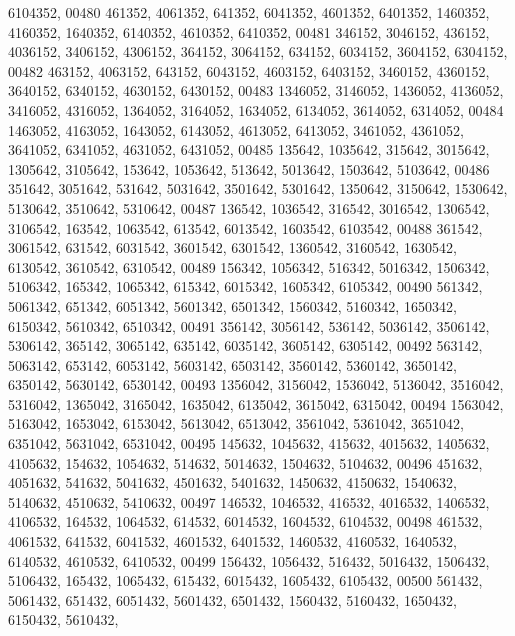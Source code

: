 \begin{DoxyCode}
      6104352,
00480        461352, 4061352,  641352, 6041352, 4601352, 6401352, 1460352, 4160352, 1640352, 6140352, 4610352, 
      6410352,
00481        346152, 3046152,  436152, 4036152, 3406152, 4306152,  364152, 3064152,  634152, 6034152, 3604152, 
      6304152,
00482        463152, 4063152,  643152, 6043152, 4603152, 6403152, 3460152, 4360152, 3640152, 6340152, 4630152, 
      6430152,
00483       1346052, 3146052, 1436052, 4136052, 3416052, 4316052, 1364052, 3164052, 1634052, 6134052, 3614052, 
      6314052,
00484       1463052, 4163052, 1643052, 6143052, 4613052, 6413052, 3461052, 4361052, 3641052, 6341052, 4631052, 
      6431052,
00485        135642, 1035642,  315642, 3015642, 1305642, 3105642,  153642, 1053642,  513642, 5013642, 1503642, 
      5103642,
00486        351642, 3051642,  531642, 5031642, 3501642, 5301642, 1350642, 3150642, 1530642, 5130642, 3510642, 
      5310642,
00487        136542, 1036542,  316542, 3016542, 1306542, 3106542,  163542, 1063542,  613542, 6013542, 1603542, 
      6103542,
00488        361542, 3061542,  631542, 6031542, 3601542, 6301542, 1360542, 3160542, 1630542, 6130542, 3610542, 
      6310542,
00489        156342, 1056342,  516342, 5016342, 1506342, 5106342,  165342, 1065342,  615342, 6015342, 1605342, 
      6105342,
00490        561342, 5061342,  651342, 6051342, 5601342, 6501342, 1560342, 5160342, 1650342, 6150342, 5610342, 
      6510342,
00491        356142, 3056142,  536142, 5036142, 3506142, 5306142,  365142, 3065142,  635142, 6035142, 3605142, 
      6305142,
00492        563142, 5063142,  653142, 6053142, 5603142, 6503142, 3560142, 5360142, 3650142, 6350142, 5630142, 
      6530142,
00493       1356042, 3156042, 1536042, 5136042, 3516042, 5316042, 1365042, 3165042, 1635042, 6135042, 3615042, 
      6315042,
00494       1563042, 5163042, 1653042, 6153042, 5613042, 6513042, 3561042, 5361042, 3651042, 6351042, 5631042, 
      6531042,
00495        145632, 1045632,  415632, 4015632, 1405632, 4105632,  154632, 1054632,  514632, 5014632, 1504632, 
      5104632,
00496        451632, 4051632,  541632, 5041632, 4501632, 5401632, 1450632, 4150632, 1540632, 5140632, 4510632, 
      5410632,
00497        146532, 1046532,  416532, 4016532, 1406532, 4106532,  164532, 1064532,  614532, 6014532, 1604532, 
      6104532,
00498        461532, 4061532,  641532, 6041532, 4601532, 6401532, 1460532, 4160532, 1640532, 6140532, 4610532, 
      6410532,
00499        156432, 1056432,  516432, 5016432, 1506432, 5106432,  165432, 1065432,  615432, 6015432, 1605432, 
      6105432,
00500        561432, 5061432,  651432, 6051432, 5601432, 6501432, 1560432, 5160432, 1650432, 6150432, 5610432, 

\end{DoxyCode}

